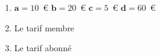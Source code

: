%
%
    \begin{enumerate}
        \item $\bm{a} = 10$~€\hfill
              $\bm{b} = 20$~€\hfill
              $\bm{c} = 5$~€\hfill
              $\bm{d} = 60$~€
        \item Le tarif membre
        \item Le tarif abonné
    \end{enumerate}
